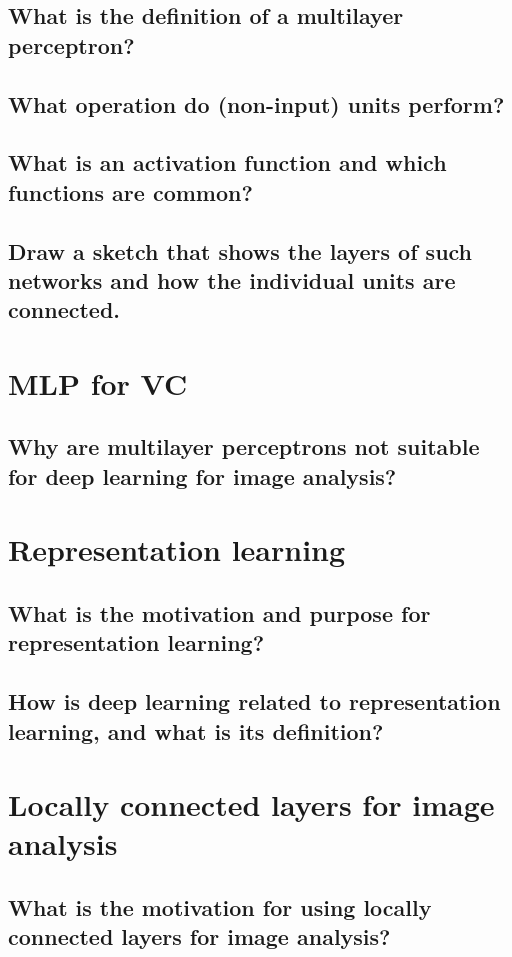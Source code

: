 \subsection{What is the definition of a multilayer perceptron?}
\subsection{What operation do (non-input) units perform?}
\subsection{What is an activation function and which functions are common?}
\subsection{Draw a sketch that shows the layers of such networks and how the individual units are connected.}

\section{MLP for VC}
\subsection{Why are multilayer perceptrons not suitable for deep learning for image analysis?}

\section{Representation learning}
\subsection{What is the motivation and purpose for representation learning?}
\subsection{How is deep learning related to representation learning, and what is its definition?}

\section{Locally connected layers for image analysis}
\subsection{What is the motivation for using locally connected layers for image analysis?}
